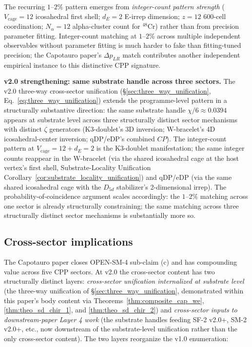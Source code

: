 \documentclass[11pt,letterpaper]{article}
\newcommand{\DeltapLR}{\Delta p_{LR}}
\begin{document}
The recurring $1$--$2\%$ pattern emerges from \emph{integer-count pattern strength} ($V_\text{cage} = 12$ icosahedral first shell; $d_E = 2$ E-irrep dimension; $z = 12$ 600-cell coordination; $N_\alpha = 12$ alpha-cluster count for $^{48}$Cr) rather than from precision parameter fitting. Integer-count matching at $1$--$2\%$ across multiple independent observables without parameter fitting is much harder to fake than fitting-tuned precision; the Capotauro paper's $\DeltapLR$ match contributes another independent empirical instance to this distinctive CPP signature.

\textbf{v2.0 strengthening: same substrate handle across three sectors.} The v2.0 three-way cross-sector unification (\S\ref{sec:three_way_unification}, Eq.~\eqref{eq:three_way_unification}) extends the programme-level pattern in a structurally substantive direction: the same substrate handle $\chi/6 \approx 0.0394$ appears at substrate level across three structurally distinct sector mechanisms with distinct $\zeta$ generators (K3-doublet's 3D inversion; W-bracelet's 4D icosahedral-center inversion; qDP/eDP's combined $CP$). The integer-count pattern at $V_\text{cage} = 12 + d_E = 2$ is the K3-doublet manifestation; the same integer counts reappear in the W-bracelet (via the shared icosahedral cage at the host vertex's first shell, Substrate-Locality Unification Corollary~\ref{cor:substrate_locality_unification}) and qDP/eDP (via the same shared icosahedral cage with the $D_{5d}$ stabilizer's 2-dimensional irrep). The probability-of-coincidence argument scales accordingly: the $1$--$2\%$ matching across one sector is already structurally constraining; the same matching across three structurally distinct sector mechanisms is substantially more so.

\subsection{Cross-sector implications}\label{sec:cross_sector_implications}

The Capotauro paper closes OPEN-SM-4 sub-claim (c) and has compounding value across five CPP sectors. At v2.0 the cross-sector content has two structurally distinct layers: \emph{cross-sector unification internalized at substrate level} (the three-way unification of \S\ref{sec:three_way_unification}, demonstrated within this paper's body content via Theorems~\ref{thm:composite_cap_we}, \ref{thm:theo_sd_chir_1}, and \ref{thm:theo_sd_chir_2}) and \emph{cross-sector inputs to downstream-paper Layer 4 work} (the substrate handles feeding SF-2 v2.0+, SM-2 v2.0+, etc., now downstream of the substrate-level unification rather than the only cross-sector content). The two layers reorganize the v1.0 enumeration:
\end{document}
